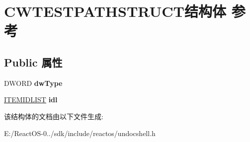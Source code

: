 \hypertarget{struct_c_w_t_e_s_t_p_a_t_h_s_t_r_u_c_t}{}\section{C\+W\+T\+E\+S\+T\+P\+A\+T\+H\+S\+T\+R\+U\+C\+T结构体 参考}
\label{struct_c_w_t_e_s_t_p_a_t_h_s_t_r_u_c_t}
\subsection*{Public 属性}
\begin{DoxyCompactItemize}
\item 
\mbox{\label{struct_c_w_t_e_s_t_p_a_t_h_s_t_r_u_c_t_ad3556379d862578b58a15d4a553592e8}} 
D\+W\+O\+RD {\bfseries dw\+Type}
\item 
\mbox{\label{struct_c_w_t_e_s_t_p_a_t_h_s_t_r_u_c_t_a63f5d272d7a9a3b6fd74de183b93ff06}} 
\hyperlink{struct___i_t_e_m_i_d_l_i_s_t}{I\+T\+E\+M\+I\+D\+L\+I\+ST} {\bfseries idl}
\end{DoxyCompactItemize}


该结构体的文档由以下文件生成\+:\begin{DoxyCompactItemize}
\item 
E\+:/\+React\+O\+S-\/0../sdk/include/reactos/undocshell.\+h\end{DoxyCompactItemize}
